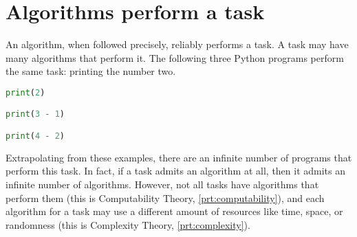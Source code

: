 \section{Algorithms perform a task}

An algorithm, when followed precisely, reliably performs a task.
A task may have many algorithms that perform it.
The following three Python programs perform the same task: printing the number two.
\begin{lstlisting}[language=Python]
print(2)

print(3 - 1)

print(4 - 2)
\end{lstlisting}
Extrapolating from these examples, there are an infinite number of programs that perform this task.
In fact, if a task admits an algorithm at all, then it admits an infinite number of algorithms.
However, not all tasks have algorithms that perform them (this is Computability Theory, \autoref{prt:computability}), and each algorithm for a task may use a different amount of resources like time, space, or randomness (this is Complexity Theory, \autoref{prt:complexity}).
